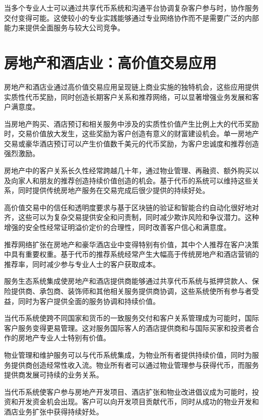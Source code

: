 \documentclass[
  Letterpaper,
]{scrbook}
\begin{document}
当多个专业人士可以通过共享代币系统和沟通平台协调复杂客户参与时，协作服务交付变得可能。这使较小的专业实践能够通过专业网络协作而不是需要广泛的内部能力来提供全面服务与较大公司竞争。

\section{房地产和酒店业：高价值交易应用}\label{ux623fux5730ux4ea7ux548cux9152ux5e97ux4e1aux9ad8ux4ef7ux503cux4ea4ux6613ux5e94ux7528}

房地产和酒店业通过高价值交易应用呈现链上商业实施的独特机会，这些应用提供实质性代币奖励，同时创造长期客户关系和推荐网络，可以显著增强业务发展和客户满意度。

当房地产购买、酒店预订和相关服务中涉及的实质性价值产生比例上大的代币奖励时，交易价值放大发生，这些奖励为客户创造有意义的财富建设机会。单一房地产交易或豪华酒店预订可以产生价值数千美元的代币奖励，为客户忠诚度和推荐创造强烈激励。

房地产中的客户关系长久性经常跨越几十年，通过物业管理、再融资、额外购买以及向家人和朋友的推荐创造持续价值创造的机会。基于代币的系统可以维持这些关系，同时提供传统房地产服务在交易完成后很少提供的持续好处。

高价值交易中的信任和透明度要求与基于区块链的验证和智能合约自动化很好地对齐，这些可以为复杂交易提供安全和问责制，同时减少欺诈风险和争议潜力。这种增强的安全性经常证明溢价定价的合理性，同时改善客户信心和满意度。

推荐网络扩张在房地产和豪华酒店业中变得特别有价值，其中个人推荐在客户决策中具有重要权重。基于代币的推荐系统经常产生大幅高于传统房地产和酒店营销的推荐率，同时减少参与专业人士的客户获取成本。

服务生态系统集成使房地产和酒店提供商能够通过共享代币系统与抵押贷款人、保险提供商、承包商、装饰师和其他相关服务提供商协调，这些系统使所有参与者受益，同时为客户提供全面的服务协调和持续价值。

当代币系统使跨不同国家和货币的一致服务交付和客户关系管理成为可能时，国际客户服务变得更易管理。这对服务国际客人的酒店提供商和与国际买家和投资者合作的房地产专业人士特别有价值。

物业管理和维护服务可以与代币系统集成，为物业所有者提供持续价值，同时为服务提供商创造经常性收入流。物业所有者可以通过物业管理参与获得代币，而服务提供商发展可持续的业务关系。

当代币系统使客户参与房地产开发项目、酒店扩张和物业改进倡议成为可能时，投资和开发资金机会出现。客户可以向开发项目贡献代币，同时从成功的物业开发和酒店业务扩张中获得持续好处。
\end{document}
